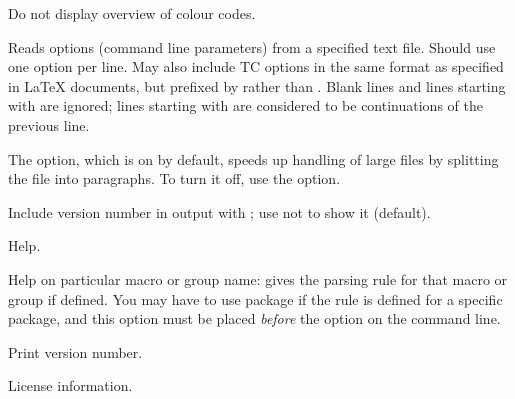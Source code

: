 \begin{description}
\option[-nocodes]Do not display overview of colour codes.

\option[-opt=, -optionfile=]Reads options (command line parameters) from a specified text file. Should use one option per line. May also include TC options in the same format as specified in \LaTeX{} documents, but prefixed by \code{\%} rather than . Blank lines and lines starting with \code{\#} are ignored; lines starting with \code{\bs{}} are considered to be continuations of the previous line.

The  option, which is on by default, speeds up handling of large files by splitting the file into paragraphs. To turn it off, use the  option.

Include version number in output with ; use  not to show it (default). 

\option[-h, -?, --help, /?]Help.

\option[-h=, -?=, --help=, /?=]Help on particular macro or group name: gives the parsing rule for that macro or group if defined. You may have to use package if the rule is defined for a specific package, and this option must be placed \emph{before} the  option on the command line.

Print version number.

License information.

\end{description}
